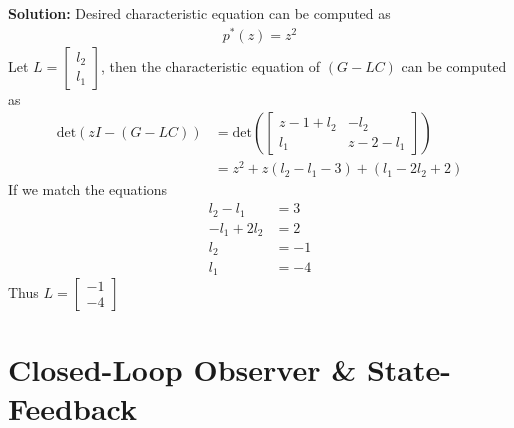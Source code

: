 \documentclass[twoside]{article}
\begin{document}
\textbf{Solution:} Desired characteristic equation can be computed as
%
\begin{align*}
  p^*(z) = z^2
\end{align*}
%
Let $L = \left[ \begin{array}{c} l_2 \\ l_1 \end{array} \right]$, then
the characteristic equation of $(G - L C)$ can be computed as
%
\begin{align*}
  \mathrm{det} \left( z I - ( G - L C ) \right) &= 
  \mathrm{det} \left(
  \left[ \begin{array}{cc} z - 1 + l_2 & -l_2 \\ l_1 & z - 2 - l_1 \end{array} \right]
  \right)
\\
&= z^2 + z (l_2 - l_1 - 3) + (l_1 - 2 l_2 + 2)
\end{align*}
%
If we match the equations
%
\begin{align*}
  l_2 - l_1 &= 3
\\
  -l_1 + 2 l_2 &= 2
\\
 l_2 &= -1
\\
 l_1 &= -4
\end{align*}
%
Thus $L = \left[ \begin{array}{c} -1 \\ -4 \end{array} \right]$

\newpage

\section{Closed-Loop Observer \& State-Feedback}
\end{document}
